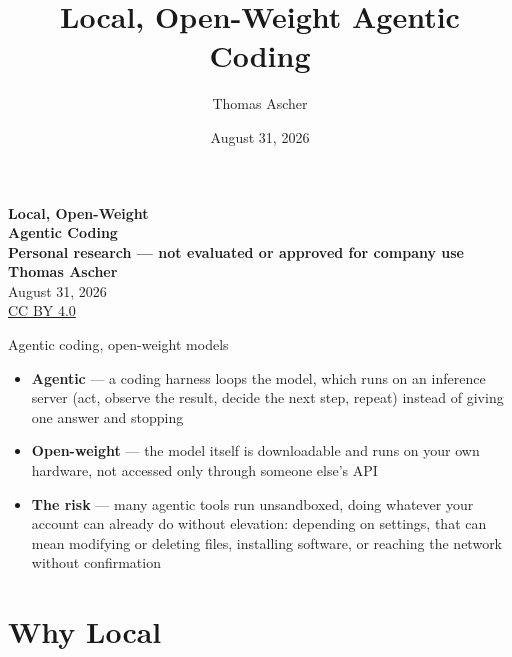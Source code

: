 \documentclass[aspectratio=169,10pt]{beamer}
\title{\textcolor{fg}{Local, Open-Weight Agentic Coding}}
\author{\textcolor{fg}{Thomas Ascher}}
\date{\textcolor{muted}{August 31, 2026}}
\begin{document}
\begin{frame}[plain]
  \vfill
  \begin{center}
    {\displayfont{}\Huge\textbf{Local, Open-Weight}}\\[0.2em]
    {\displayfont{}\Huge\textbf{Agentic \textcolor{accent}{Coding}}}\\[1.2em]
    {\small\color{bad}\textbf{Personal research --- not evaluated or
    approved for company use}}\\[1.2em]
    {\color{fg}\textbf{Thomas Ascher}}\\
    {\small\color{muted}August 31, 2026}\\[0.8em]
    {\scriptsize\color{muted}\href{https://creativecommons.org/licenses/by/4.0/}{CC BY 4.0}}
  \end{center}
  \vfill
\end{frame}

\begin{frame}{Agentic coding, open-weight models}
  \begin{itemize}
    \item \textbf{Agentic} --- a coding harness loops the model, which runs
      on an inference server (act, observe the result, decide the next
      step, repeat) instead of giving one answer and stopping
    \item \textbf{Open-weight} --- the model itself is downloadable and
      runs on your own hardware, not accessed only through someone else's
      API
    \item \textbf{The risk} --- many agentic tools run unsandboxed, doing
      whatever your account can already do without elevation: depending on
      settings, that can mean modifying or deleting files, installing
      software, or reaching the network without confirmation
  \end{itemize}
\end{frame}

\section{Why Local}
\end{document}
